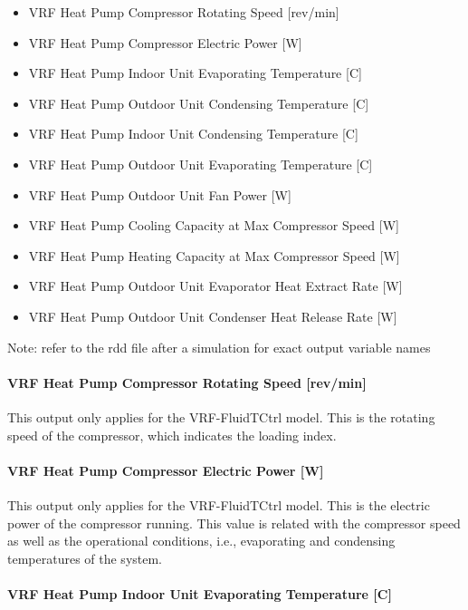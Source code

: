 \begin{itemize}
\item
  VRF Heat Pump Compressor Rotating Speed {[}rev/min{]}
\item
  VRF Heat Pump Compressor Electric Power {[}W{]}
\item
  VRF Heat Pump Indoor Unit Evaporating Temperature {[}C{]}
\item
  VRF Heat Pump Outdoor Unit Condensing Temperature {[}C{]}
\item
  VRF Heat Pump Indoor Unit Condensing Temperature {[}C{]}
\item
  VRF Heat Pump Outdoor Unit Evaporating Temperature {[}C{]}
\item
  VRF Heat Pump Outdoor Unit Fan Power {[}W{]}
\item
  VRF Heat Pump Cooling Capacity at Max Compressor Speed {[}W{]}
\item
  VRF Heat Pump Heating Capacity at Max Compressor Speed {[}W{]}
\item
  VRF Heat Pump Outdoor Unit Evaporator Heat Extract Rate {[}W{]}
\item
  VRF Heat Pump Outdoor Unit Condenser Heat Release Rate {[}W{]}
\end{itemize}

Note: refer to the rdd file after a simulation for exact output variable names

\paragraph{VRF Heat Pump Compressor Rotating Speed {[}rev/min{]}}\label{vrf-heat-pump-compressor-rotating-speed-revmin}

This output only applies for the VRF-FluidTCtrl model. This is the rotating speed of the compressor, which indicates the loading index.

\paragraph{VRF Heat Pump Compressor Electric Power {[}W{]}}\label{vrf-heat-pump-compressor-electric-power-at-cooling-mode-w}

This output only applies for the VRF-FluidTCtrl model. This is the electric power of the compressor running. This value is related with the compressor speed as well as the operational conditions, i.e., evaporating and condensing temperatures of the system.

\paragraph{VRF Heat Pump Indoor Unit Evaporating Temperature {[}C{]}}\label{vrf-heat-pump-indoor-unit-evaporating-temperature-at-cooling-mode-c}

